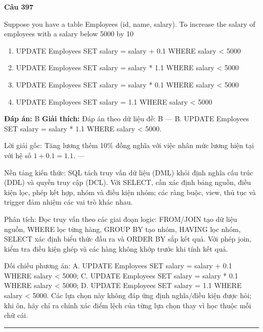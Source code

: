 \documentclass[11pt,a4paper]{article}
\newenvironment{question}[1]{%
  \par\vspace{1em}\noindent\textbf{\large Câu #1}\par\vspace{0.4em}
}{%
  \par\vspace{1em}\hrule\vspace{0.6em}
}
\newenvironment{choices}{%
  \begin{enumerate}[label=\textbf{\Alph*.},leftmargin=2.2em,itemsep=2pt,topsep=3pt]
}{%
  \end{enumerate}
}
\newcommand{\choice}{\item}
\begin{document}
\begin{question}{397}
Suppose you have a table Employees (id, name, salary). To increase the salary of employees with a salary below 5000 by 10%
\begin{choices}
\choice UPDATE Employees SET salary = salary + 0.1 WHERE salary < 5000
\choice UPDATE Employees SET salary = salary * 1.1 WHERE salary < 5000
\choice UPDATE Employees
SET salary = salary * 0.1 WHERE salary < 5000
\choice UPDATE Employees
SET salary = 1.1 WHERE salary < 5000
\end{choices}
\textbf{Đáp án:} B
\textbf{Giải thích:} Đáp án theo dữ liệu đề: B — B. UPDATE Employees SET salary = salary * 1.1 WHERE salary < 5000.

Lời giải gốc: Tăng lương thêm 10\% đồng nghĩa với việc nhân mức lương hiện tại với hệ số $1 + 0.1 = 1.1$. ---

Nền tảng kiến thức: SQL tách truy vấn dữ liệu (DML) khỏi định nghĩa cấu trúc (DDL) và quyền truy cập (DCL). Với SELECT, cần xác định bảng nguồn, điều kiện lọc, phép kết hợp, nhóm và điều kiện nhóm; các ràng buộc, view, thủ tục và trigger đảm nhiệm các vai trò khác nhau.

Phân tích: Đọc truy vấn theo các giai đoạn logic: FROM/JOIN tạo dữ liệu nguồn, WHERE lọc từng hàng, GROUP BY tạo nhóm, HAVING lọc nhóm, SELECT xác định biểu thức đầu ra và ORDER BY sắp kết quả. Với phép join, kiểm tra điều kiện ghép và các hàng không khớp trước khi tính kết quả.

Đối chiếu phương án: A. UPDATE Employees SET salary = salary + 0.1 WHERE salary < 5000; C. UPDATE Employees SET salary = salary * 0.1 WHERE salary < 5000; D. UPDATE Employees SET salary = 1.1 WHERE salary < 5000. Các lựa chọn này không đáp ứng định nghĩa/điều kiện được hỏi; khi ôn, hãy chỉ ra chính xác điểm lệch của từng lựa chọn thay vì học thuộc mỗi chữ cái.
\end{question}
\end{document}
